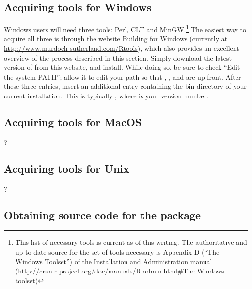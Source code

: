 \documentclass[article]{jss}
\begin{document}
\subsection{Acquiring tools for Windows}
\label{ToolsWindows}

Windows users will need three tools: Perl, CLT and MinGW.\footnote{This list of necessary tools is current as of this writing. The authoritative and up-to-date source for the set of tools necessary is Appendix D (``The Windows Toolset'') of the  Installation and Administration manual (\url{http://cran.r-project.org/doc/manuals/R-admin.html\#The-Windows-toolset})} The easiest way to acquire all three is through the website Building  for Windows (currently at \url{http://www.murdoch-sutherland.com/Rtools}), which also provides an excellent overview of the process described in this section.  Simply download the latest version of  from this website, and install.  While doing so, be sure to check ``Edit the system PATH''; allow it to edit your path so that , , and  are up front. After these three entries, insert an additional entry containing the bin directory of your current  installation.  This is typically , where  is your  version number.


\subsection{Acquiring tools for MacOS}
\label{ToolsMac}

?

\subsection{Acquiring tools for Unix}
\label{ToolsUnix}

?

\subsection[Obtaining source code for the ergmuserterms package]{Obtaining source code for the  package}
\label{Source}
\end{document}
